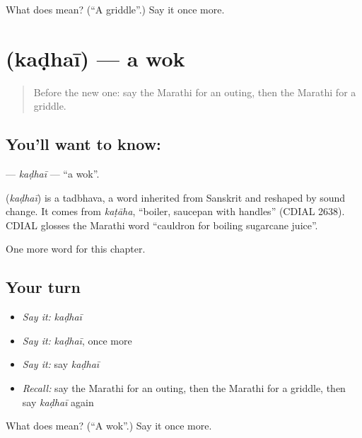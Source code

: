 \begin{tcolorbox}[breakable,colback=teal!4,colframe=teal!35!black,title={Before you move on}]
What does  mean? (\textquotedblleft{}A griddle\textquotedblright{}.) Say it once more.
\end{tcolorbox}
\section[\texorpdfstring{\mr{कढई} (kaḍhaī)}{कढई (kaḍhaī)}]{ (kaḍhaī) — a wok}

\label{lesson:MR-C243-kadhai}



\begin{quote}
Before the new one: say the Marathi for an outing, then the Marathi for a griddle.
\end{quote}

\subsection*{You'll want to know: }
\textbf{} — \emph{kaḍhaī} — \textquotedblleft{}a wok\textquotedblright{}.

\begin{cousinweb}
\textbf{} (\emph{kaḍhaī}) is a tadbhava, a word inherited from Sanskrit and reshaped by sound change. It comes from \emph{kaṭāha}, \textquotedblleft{}boiler, saucepan with handles\textquotedblright{} (CDIAL 2638). CDIAL glosses the Marathi word \textquotedblleft{}cauldron for boiling sugarcane juice\textquotedblright{}.
\end{cousinweb}

\begin{grammarlens}[title={What you've built}]
One more word for this chapter.
\end{grammarlens}

\subsection*{Your turn}
\begin{itemize}
\raggedright
  \item \emph{Say it:} \emph{kaḍhaī}
  \item \emph{Say it:} \emph{kaḍhaī}, once more
  \item \emph{Say it:} say \emph{kaḍhaī}
  \item \emph{Recall:} say the Marathi for an outing, then the Marathi for a griddle, then say \emph{kaḍhaī} again
\end{itemize}

\begin{tcolorbox}[breakable,colback=teal!4,colframe=teal!35!black,title={Before you move on}]
What does  mean? (\textquotedblleft{}A wok\textquotedblright{}.) Say it once more.
\end{tcolorbox}
